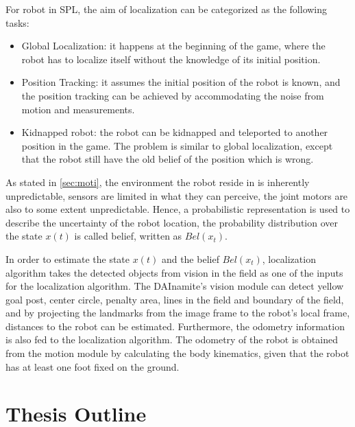 For robot in \gls{SPL}, the aim of localization can be categorized as the following tasks:
\begin{itemize}
  \item Global Localization: it happens at the beginning of the game, where the robot has to localize itself without the knowledge of its initial position.
  \item Position Tracking: it assumes the initial position of the robot is known, and the position tracking can be achieved by accommodating the noise from motion and measurements.
  \item Kidnapped robot: the robot can be kidnapped and teleported to another position in the game. The problem is similar to global localization, except that the robot still have the old belief of the position which is wrong.
\end{itemize}
As stated in \autoref{sec:moti}, the environment the robot reside in is inherently unpredictable, sensors are limited in what they can perceive, the joint motors are also to some extent unpredictable. Hence, a probabilistic representation is used to describe the uncertainty of the robot location, the probability distribution over the state $x(t)$ is called belief, written as $Bel(x_{t})$.

In order to estimate the state $x(t)$ and the belief $Bel(x_{t})$, localization algorithm takes the detected objects from vision in the field as one of the inputs for the localization algorithm. The DAInamite's vision module can detect yellow goal post, center circle, penalty area, lines in the field and boundary of the field, and by projecting the landmarks from the image frame to the robot's local frame, distances to the robot can be estimated. Furthermore, the odometry information is also fed to the localization algorithm. The odometry of the robot is obtained from the motion module by calculating the body kinematics, given that the robot has at least one foot fixed on the ground. 


\section{Thesis Outline\label{sec:outline}}

